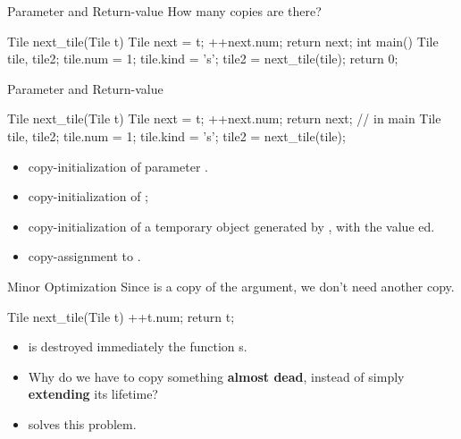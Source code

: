 \documentclass{beamer}
\begin{document}
\begin{frame}[fragile]{Parameter and Return-value}
    How many copies are there?
    \begin{cpp}
Tile next_tile(Tile t) {
  Tile next = t;
  ++next.num;
  return next;
}
int main() {
  Tile tile, tile2;
  tile.num = 1;
  tile.kind = 's';
  tile2 = next_tile(tile);
  return 0;
}
    \end{cpp}
\end{frame}

\begin{frame}[fragile]{Parameter and Return-value}
    \begin{cpp}
Tile next_tile(Tile t) {
  Tile next = t;
  ++next.num;
  return next;
}
// in main
Tile tile, tile2;
tile.num = 1; tile.kind = 's';
tile2 = next_tile(tile);
    \end{cpp}
    \begin{itemize}
        \item copy-initialization of parameter .
        \item copy-initialization of ;
        \item copy-initialization of a temporary object generated by , with the value ed.
        \item copy-assignment to .
    \end{itemize}
\end{frame}

\begin{frame}[fragile]{Minor Optimization}
    Since  is a copy of the argument, we don't need another copy.
    \begin{cpp}
Tile next_tile(Tile t) {
  ++t.num;
  return t;
}
    \end{cpp}
    \pause
    \begin{itemize}
        \item {} is destroyed immediately the function s.
        \pause
        \item Why do we have to copy something \textbf{almost dead}, instead of simply \textbf{extending} its lifetime?
        \pause
        \item {} solves this problem.
    \end{itemize}
\end{frame}
\end{document}
